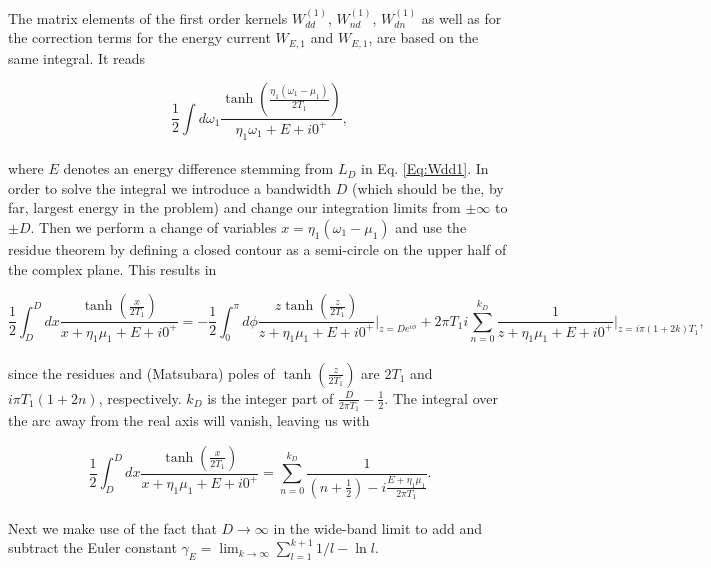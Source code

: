 \documentclass{article}
\begin{document}
The matrix elements of the first order kernels $W_{dd}^{(1)}$, $W_{nd}^{(1)}$, $W_{dn}^{(1)}$ as well as for the correction terms for the energy current $W_{E,1}$ and $W_{E,1}$, are based on the same integral. It reads

\begin{equation}
    \frac{1}{2}\int d\omega_1 \frac{\tanh\left (\frac{\eta_1(\omega_1-\mu_1)}{2T_1}\right )}{\eta_1\omega_1 + E + i0^+},
\end{equation}
\\
where $E$ denotes an energy difference stemming from $L_D$ in Eq. \ref{Eq:Wdd1}. In order to solve the integral we introduce a bandwidth $D$ (which should be the, by far, largest energy in the problem) and change our integration limits from $\pm\infty$ to $\pm D$. Then we perform a change of variables $x = \eta_1(\omega_1-\mu_1)$ and use the residue theorem by defining a closed contour as a semi-circle on the upper half of the complex plane. This results in 

\begin{equation}
    \frac{1}{2}\int_D^Ddx \frac{\tanh\left (\frac{x}{2T_1}\right )}{x + \eta_1\mu_1 + E + i0^+} = -\frac{1}{2}\int_0^\pi d\phi \frac{z\tanh\left (\frac{z}{2T_1}\right )}{z + \eta_1\mu_1+ E + i0^+}\Bigg |_{z=De^{i\phi}} + 2\pi T_1 i\sum_{n=0}^{k_D} \frac{1}{z+\eta_1\mu_1 + E+i0^+}\Bigg |_{z=i\pi(1+2k)T_1},
\end{equation}
\\
since the residues and (Matsubara) poles of $\tanh\left ( \frac{z}{2T_1} \right )$ are $2T_1$ and $i\pi T_1(1+2n)$, respectively. $k_D$ is the integer part of $\frac{D}{2\pi T_1}-\frac{1}{2}$. The integral over the arc away from the real axis will vanish, leaving us with

\begin{equation}
   \frac{1}{2}\int_D^Ddx \frac{\tanh\left (\frac{x}{2T_1}\right )}{x + \eta_1\mu_1 + E + i0^+}= \sum_{n=0}^{k_D} \frac{1}{\left ( n+\frac{1}{2}\right ) - i\frac{E+\eta_1\mu_1}{2\pi T_1}}.
\end{equation}
\\
Next we make use of the fact that $D\rightarrow \infty$ in the wide-band limit to add and subtract the Euler constant $\gamma_E=\lim_{k\rightarrow \infty}\sum_{l=1}^{k+1}1/l-\ln l$.
\end{document}
